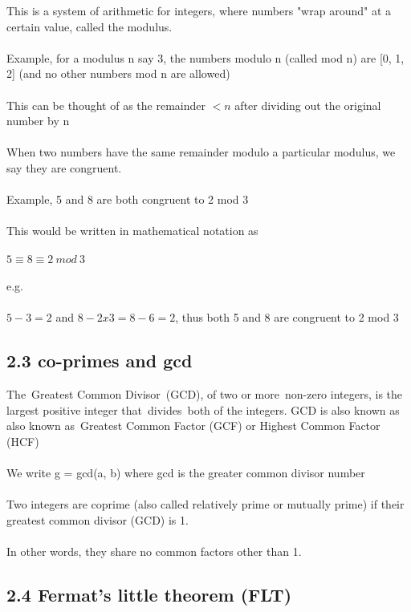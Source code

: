 \documentclass[11pt]{article}   	%
\begin{document}
This is a system of arithmetic for integers, where numbers "wrap around" at a certain value, called the modulus. \\
\\
Example, for a modulus n say 3, the numbers modulo n (called mod n) are [0, 1, 2] (and no other numbers mod n are allowed) \\
\\
This can be thought of as the remainder $ < n $ after dividing out the original number by n \\
\\
When two numbers have the same remainder modulo a particular modulus, we say they are congruent. \\
\\
Example, 5 and 8 are both congruent to 2 mod 3 \\
\\
This would be written in mathematical notation as \\
\\
$ 5 \equiv 8 \equiv 2 \ mod \ 3 $ \\
\\
e.g. \\
\\
$ 5 - 3 = 2 $ and $ 8 - 2x3 = 8 - 6 = 2 $, thus both 5 and 8 are congruent to 2 mod 3 \\


\subsection*{2.3 co-primes and gcd}

The Greatest Common Divisor (GCD), of two or more non-zero integers, is the largest positive integer that divides both of the integers. GCD is also known as also known as Greatest Common Factor (GCF) or Highest Common Factor (HCF) \\
\\
We write g = gcd(a, b) where gcd is the greater common divisor number \\
\\
Two integers are coprime (also called relatively prime or mutually prime) if their greatest common divisor (GCD) is 1. \\
\\
In other words, they share no common factors other than 1.


\subsection*{2.4 Fermat’s little theorem (FLT)}
\end{document}
